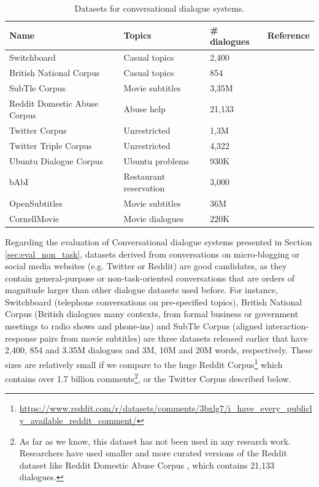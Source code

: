 \label{subsec:conv}
\begin{table}[t]
\centering
\begin{tabular}{llll}
\hline
Name & Topics & \# dialogues      & Reference\\ \hline
Switchboard & Casual topics & 2,400 &  \\
British National Corpus & Casual topics & 854 &  \\
SubTle Corpus & Movie subtitles & 3,35M &  \\
Reddit Domestic Abuse Corpus & Abuse help & 21,133 & \\
Twitter Corpus & Unrestricted & 1,3M &  \\
Twitter Triple Corpus & Unrestricted & 4,322 &  \\
Ubuntu Dialogue Corpus & Ubuntu problems  & 930K &  \\
bAbI & Restaurant reservation & 3,000 &  \\
OpenSubtitles & Movie subtitles & 36M &  \\
CornellMovie & Movie dialogues & 220K &  \\
\hline
\end{tabular}
\caption{Datasets for conversational dialogue systems.}
\label{tab:conv}
\end{table}
Regarding the evaluation of Conversational dialogue systems presented in Section \ref{sec:eval_non_task}, datasets derived from conversations on micro-blogging or social media websites (e.g. Twitter or Reddit) are good candidates, as they contain general-purpose or non-task-oriented conversations that are orders of magnitude larger than other  dialogue datasets used before. For instance, Switchboard  (telephone conversations on pre-specified topics), British National Corpus  (British dialogues many contexts, from formal business or government meetings to radio shows and phone-ins) and SubTle Corpus  (aligned interaction-response pairs from movie subtitles) are three datasets released earlier that have 2,400, 854 and 3.35M dialogues and 3M, 10M and 20M words, respectively. These sizes are relatively small if we compare to the huge Reddit Corpus\footnote{\url{https://www.reddit.com/r/datasets/comments/3bxlg7/i_have_every_publicly_available_reddit_comment/}} which contains over 1.7 billion comments\footnote{As far as we know, this dataset has not been used in any research work. Researchers have used smaller and more curated versions of the Reddit dataset like Reddit Domestic Abuse Corpus , which contains 21,133 dialogues.}, or the Twitter Corpus described below.
